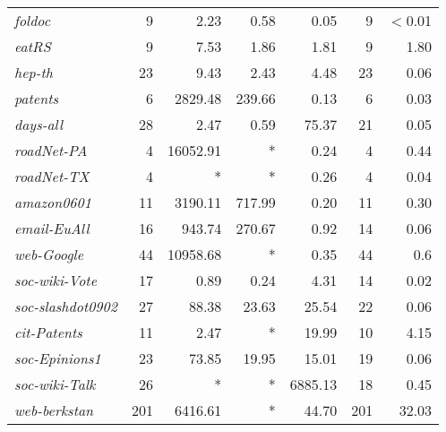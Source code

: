 \begin{table}[tbh]
\begin{tabular}{lr|rrr|rr}
{\it foldoc}	&	9	&	2.23	&	0.58	&	0.05	&	9	&	$<$0.01	\\
{\it eatRS}	&	9	&	7.53	&	1.86	&	1.81	&	9	&	1.80	\\
{\it hep-th}	&	23	&	9.43	&	2.43	&	4.48	&	23	&	0.06	\\
{\it patents}	&	6	&	2829.48	&	239.66	&	0.13	&	6	&	0.03	\\
{\it days-all}	&	28	&	2.47	&	0.59	&	75.37	&	21	&	0.05	\\
{\it roadNet-PA}	&	4	&	16052.91	&	*	&	0.24	&	4	&	0.44	\\
{\it roadNet-TX}	&	4	&	*	&	*	&	0.26	&	4	&	0.04	\\
{\it amazon0601}	&	11	&	3190.11	&	717.99	&	0.20	&	11	&	0.30	\\
{\it email-EuAll}	&	16	&	943.74	&	270.67	&	0.92	&	14	&	0.06	\\
{\it web-Google}	&	44	&	10958.68	&	*	&	0.35	&	44	&	0.6	\\
{\it soc-wiki-Vote}	&	17	&	0.89	&	0.24	&	4.31	&	14	&	0.02	\\
{\it soc-slashdot0902}	&	27	&	88.38	&	23.63	&	25.54	&	22	&	0.06	\\
{\it cit-Patents}	&	11	&	2.47	&	*	&	19.99	&	10	&	4.15	\\
{\it soc-Epinions1}	&	23	&	73.85	&	19.95	&	15.01	&	19	&	0.06	\\
{\it soc-wiki-Talk}	&	26	&	*	&	*	&	6885.13	&	18	&	0.45	\\
{\it web-berkstan}	&	201	&	6416.61	&	*	&	44.70	&	201	&	32.03	\\
	\bottomrule\bottomrule
\end{tabular}
\end{table}
